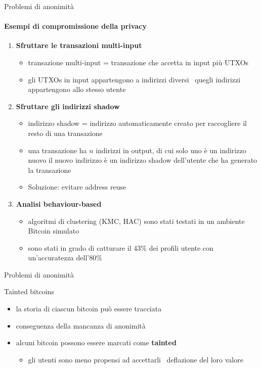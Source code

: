 \documentclass{beamer}
\begin{document}
  \begin{frame}{Problemi di anonimità}
  \framesubtitle{Esempi di compromissione della privacy}
      \begin{enumerate}
          \item \textbf{Sfruttare le transazioni multi-input}
          \begin{itemize}
              \item transazione multi-input = transazione che accetta in input più UTXOs 
              \item gli UTXOs in input appartengono a indirizzi diversi \MVRightarrow\, quegli indirizzi appartengono allo stesso utente
          \end{itemize}
          \pause
          \item \textbf{Sfruttare gli indirizzi shadow}
          \begin{itemize}
              \item indirizzo shadow = indirizzo automaticamente creato per raccogliere il resto di una transazione
              \item una transazione ha $n$ indirizzi in output, di cui solo uno è un indirizzo nuovo \MVRightarrow il nuovo indirizzo è un indirizzo shadow dell'utente che ha generato la transazione
              \item Soluzione: evitare address reuse 
          \end{itemize}
          \pause
          \item \textbf{Analisi behaviour-based}
          \begin{itemize}
              \item algoritmi di clustering (KMC, HAC) sono stati testati in un ambiente Bitcoin simulato \cite{androulaki2013evaluating}
              \item sono stati in grado di catturare il 43\% dei profili utente con un'accuratezza dell'80\% 
          \end{itemize}
      \end{enumerate}
  \end{frame}
  
  
  
  \begin{frame}{Problemi di anonimità}
      \begin{block}{Tainted bitcoins}
        \begin{itemize}
            \item la storia di ciascun bitcoin può essere tracciata
            \item conseguenza della mancanza di anonimità
            \item alcuni bitcoin possono essere marcati come \textbf{tainted}
            \begin{itemize}
                \item gli utenti sono meno propensi ad accettarli \MVRightarrow\, deflazione del loro valore
            \end{itemize}
        \end{itemize}
      \end{block}
  \end{frame}
  
\end{document}
